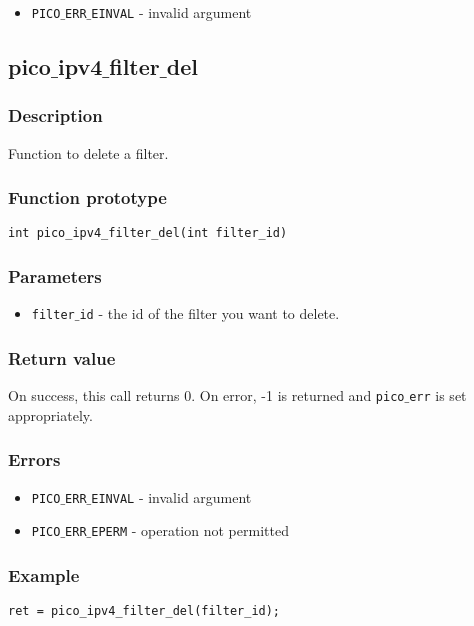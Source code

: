 \begin{itemize}[noitemsep]
\item \texttt{PICO$\_$ERR$\_$EINVAL} - invalid argument
\end{itemize}


\subsection{pico$\_$ipv4$\_$filter$\_$del}

\subsubsection*{Description}
Function to delete a filter.

\subsubsection*{Function prototype}
\begin{verbatim}
int pico_ipv4_filter_del(int filter_id)
\end{verbatim}

\subsubsection*{Parameters}
\begin{itemize}[noitemsep]
\item \texttt{filter$\_$id} - the id of the filter you want to delete.
\end{itemize}

\subsubsection*{Return value}
On success, this call returns 0.
On error, -1 is returned and \texttt{pico$\_$err} is set appropriately.

\subsubsection*{Errors}

\begin{itemize}[noitemsep]
\item \texttt{PICO$\_$ERR$\_$EINVAL} - invalid argument
\item \texttt{PICO$\_$ERR$\_$EPERM} - operation not permitted
\end{itemize}

\subsubsection*{Example}
\begin{verbatim}
ret = pico_ipv4_filter_del(filter_id);
\end{verbatim}


